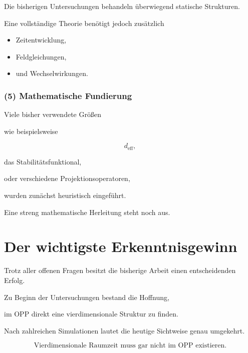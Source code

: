 Die bisherigen Untersuchungen behandeln überwiegend statische Strukturen.

Eine vollständige Theorie benötigt jedoch zusätzlich

\begin{itemize}

\item

Zeitentwicklung,

\item

Feldgleichungen,

\item

und Wechselwirkungen.

\end{itemize}


\subsubsection*{(5) Mathematische Fundierung}

Viele bisher verwendete Größen

wie beispielsweise

\[
d_{\mathrm{eff}},
\]

das Stabilitätsfunktional,

oder verschiedene Projektionsoperatoren,

wurden zunächst heuristisch eingeführt.

Eine streng mathematische Herleitung steht noch aus.


\section*{Der wichtigste Erkenntnisgewinn}

Trotz aller offenen Fragen besitzt die bisherige Arbeit einen entscheidenden Erfolg.

Zu Beginn der Untersuchungen bestand die Hoffnung,

im OPP direkt eine vierdimensionale Struktur zu finden.

Nach zahlreichen Simulationen lautet die heutige Sichtweise genau umgekehrt.

\[
\boxed{
\text{Vierdimensionale Raumzeit muss gar nicht im OPP existieren.}
}
\]

